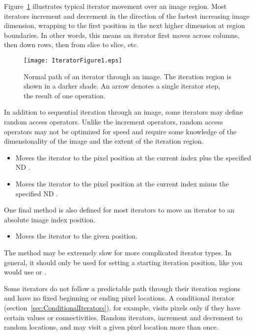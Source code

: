 Figure~{\ref{fig:WalkingIterator}} illustrates typical iterator movement over
an image region.  Most iterators increment and decrement in the direction of
the fastest increasing image dimension, wrapping to the first position in the
next higher dimension at region boundaries.  In other words, this means an
iterator first moves across columns, then down rows, then from slice to slice,
etc.

\begin{figure}
\centering
\texttt{[image: IteratorFigure1.eps]}
\caption[ITK image iteration]{Normal path of an iterator through an image.  The
iteration region is shown in a darker shade.  An arrow denotes a single iterator
step, the result of one \code{++} operation.}
\protect\label{fig:WalkingIterator}
\end{figure}

In addition to sequential iteration through an image, some iterators may define
random access operators.  Unlike the increment operators, random access
operators may not be optimized for speed and require some knowledge of the
dimensionality of the image and the extent of the iteration region.  

\begin{itemize}
\item \textbf{} Moves the iterator to the pixel
position at the current index plus the specified ND . 

\item \textbf{} Moves the iterator to the pixel
position at the current index minus the specified ND .
\end{itemize}

One final method is also defined for most iterators to move an iterator to an
absolute image index position.

\begin{itemize}
\item \textbf{} Moves the iterator to the given
 position.
\end{itemize}

The  method may be extremely slow for more complicated
iterator types. In general, it should only be used for setting a starting
iteration position, like you would use  or .

Some iterators do not follow a predictable path through their iteration regions
and have no fixed beginning or ending pixel locations.  A conditional iterator
(section~\ref{sec:ConditionalIterators}), for example, visits pixels only if
they have certain values or connectivities.  Random iterators, increment and
decrement to random locations, and may visit a given pixel location more than
once.

